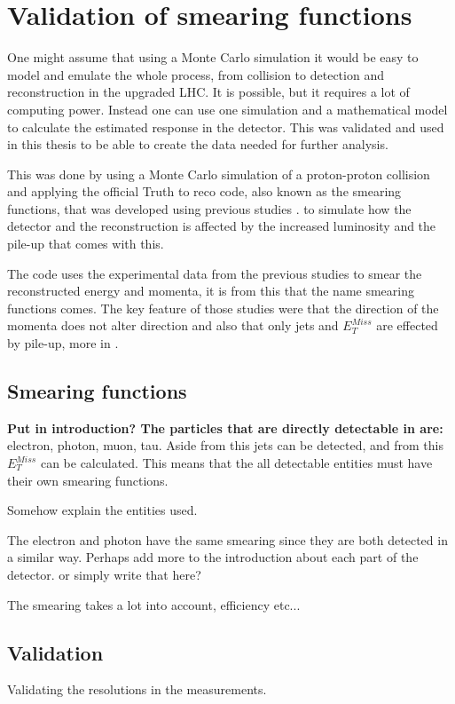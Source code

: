 \chapter{Validation of smearing functions}\label{cha:vali}
One might assume that using a Monte Carlo simulation it would be easy to model and emulate the whole process, from collision to detection and reconstruction in the upgraded LHC. It is possible, but it requires a lot of computing power. Instead one can use one simulation and a mathematical model to calculate the estimated response in the detector. This was validated and used in this thesis to be able to create the data needed for further analysis. 

This was done by using a Monte Carlo simulation of a proton-proton collision and applying the official Truth to reco code, also known as the smearing functions, that was developed using previous studies \citep{ATLAS:LOI2, ATL-PHYS-PUB-2013-004}. to simulate how the detector and the reconstruction is affected by the increased luminosity and the pile-up that comes with this.

The code uses the experimental data from the previous studies to smear the reconstructed energy and momenta, it is from this that the name smearing functions comes.
The key feature of those studies were that the direction of the momenta does not alter direction and also that only jets and $E^{Miss}_T$ are effected by pile-up, more in .

\newpage
\section{Smearing functions}\label{sec:smear}
\textbf{Put in introduction? The particles that are directly detectable in \abbrATLAS are:} electron, photon, muon, tau. Aside from this jets can be detected, and from this $E_T^{Miss}$ can be calculated. This means that the all detectable entities must have their own smearing functions.

Somehow explain the entities used. 

The electron and photon have the same smearing since they are both detected in a similar way.  Perhaps add more to the introduction about each part of the detector. or simply write that here?

The smearing takes a lot into account, efficiency etc...

\section{Validation}\label{sec:vali}
Validating the resolutions in the measurements.  


